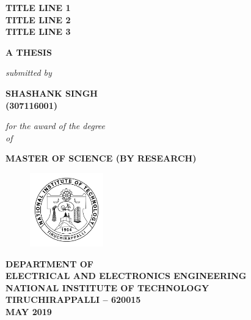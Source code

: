 \begin{center}
\Large
\linespread{1.15}
\end{center}
\begin{center}
\linespread{1.15}
\fontsize{18pt}{18pt}\selectfont\bfseries TITLE LINE 1\\
TITLE LINE 2\\
TITLE LINE 3
\end{center}
\begin{center}
\vspace{0.3in}
\begin{center}
\fontsize{14pt}{14pt}\selectfont\bfseries A THESIS
\end{center}
\vspace{0.25in}
\textit{submitted by}\\
\vspace{0.4in}
\begin{center}
\fontsize{14pt}{14pt}\selectfont\bfseries SHASHANK SINGH
\\(307116001)
\end{center}
\vspace{0.4in}
\textit{for the award of the degree}\\
\vspace{0.25in}
\textit{of}\\
\vspace{0.25in}
\begin{center}
\fontsize{14pt}{14pt}\selectfont\bfseries MASTER OF SCIENCE (BY RESEARCH)
\end{center}
\vspace{0.25in}
\begin{figure}[h]
\centering
\includegraphics[height=1.25in,width=1.25in]{Pictures/NITT.png}
\end{figure}
\vspace{0.15in}
\begin{center}
\linespread{1.15}
\fontsize{14pt}{14pt}\selectfont\bfseries 
DEPARTMENT OF\\
ELECTRICAL AND ELECTRONICS ENGINEERING\\
NATIONAL INSTITUTE OF TECHNOLOGY\\
TIRUCHIRAPPALLI -- 620015\\
\vspace{0.25in}
MAY 2019
\end{center}
\thispagestyle{empty}
\end{center}